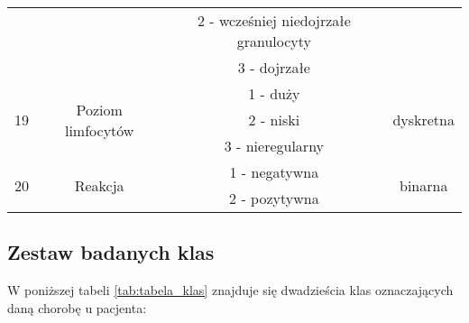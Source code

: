\documentclass{article}
\begin{document}
\begin{center}
\begin{longtable}{ |c|c|c|c| }
                    &                                                     & 2 - wcześniej niedojrzałe granulocyty &                            \\
                    &                                                     & 3 - dojrzałe                          &                            \\ \hline
\multirow{3}{*}{19} & \multirow{3}{*}{Poziom limfocytów}                  & 1 - duży                              & \multirow{3}{*}{dyskretna} \\
                    &                                                     & 2 - niski                             &                            \\
                    &                                                     & 3 - nieregularny                      &                            \\ \hline
\multirow{2}{*}{20} & \multirow{2}{*}{Reakcja}                            & 1 - negatywna                         & \multirow{2}{*}{binarna}   \\
                    &                                                     & 2 - pozytywna                         &                            \\ \hline
		
	\end{longtable}
\end{center}

\subsection{Zestaw badanych klas}
W poniższej tabeli \ref{tab:tabela_klas} znajduje się dwadzieścia klas oznaczających daną chorobę u pacjenta:
\end{document}

